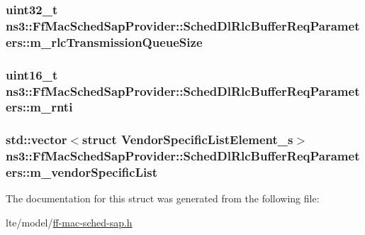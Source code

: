 \subsubsection[{\texorpdfstring{m\+\_\+rlc\+Transmission\+Queue\+Size}{m_rlcTransmissionQueueSize}}]{\setlength{\rightskip}{0pt plus 5cm}uint32\+\_\+t ns3\+::\+Ff\+Mac\+Sched\+Sap\+Provider\+::\+Sched\+Dl\+Rlc\+Buffer\+Req\+Parameters\+::m\+\_\+rlc\+Transmission\+Queue\+Size}\hypertarget{structns3_1_1FfMacSchedSapProvider_1_1SchedDlRlcBufferReqParameters_aa7ebd83b9a4b34b2323aa8eec42d36e4}{}\label{structns3_1_1FfMacSchedSapProvider_1_1SchedDlRlcBufferReqParameters_aa7ebd83b9a4b34b2323aa8eec42d36e4}
\subsubsection[{\texorpdfstring{m\+\_\+rnti}{m_rnti}}]{\setlength{\rightskip}{0pt plus 5cm}uint16\+\_\+t ns3\+::\+Ff\+Mac\+Sched\+Sap\+Provider\+::\+Sched\+Dl\+Rlc\+Buffer\+Req\+Parameters\+::m\+\_\+rnti}\hypertarget{structns3_1_1FfMacSchedSapProvider_1_1SchedDlRlcBufferReqParameters_ac8ebe35f9f5f6f1a001e7ff5ffb4186b}{}\label{structns3_1_1FfMacSchedSapProvider_1_1SchedDlRlcBufferReqParameters_ac8ebe35f9f5f6f1a001e7ff5ffb4186b}
\subsubsection[{\texorpdfstring{m\+\_\+vendor\+Specific\+List}{m_vendorSpecificList}}]{\setlength{\rightskip}{0pt plus 5cm}std\+::vector$<$struct {\bf Vendor\+Specific\+List\+Element\+\_\+s}$>$ ns3\+::\+Ff\+Mac\+Sched\+Sap\+Provider\+::\+Sched\+Dl\+Rlc\+Buffer\+Req\+Parameters\+::m\+\_\+vendor\+Specific\+List}\hypertarget{structns3_1_1FfMacSchedSapProvider_1_1SchedDlRlcBufferReqParameters_a9bace922f37332f822a7ce7b54437b84}{}\label{structns3_1_1FfMacSchedSapProvider_1_1SchedDlRlcBufferReqParameters_a9bace922f37332f822a7ce7b54437b84}


The documentation for this struct was generated from the following file\+:\begin{DoxyCompactItemize}
\item 
lte/model/\hyperlink{ff-mac-sched-sap_8h}{ff-\/mac-\/sched-\/sap.\+h}\end{DoxyCompactItemize}
